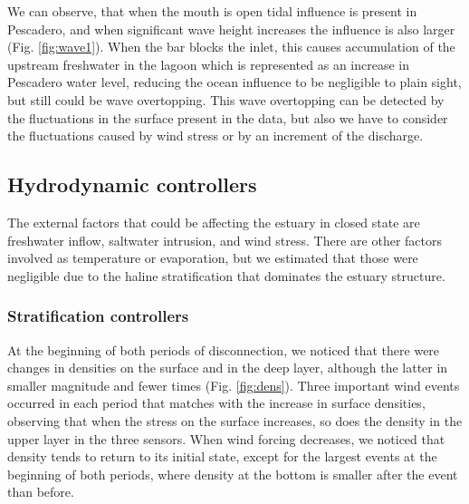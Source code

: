\documentclass[11pt,letterpaper]{article}
\begin{document}
We can observe, that when the mouth is open tidal influence is present in Pescadero, and when significant wave height increases the influence is also larger (Fig. \ref{fig:wave1}). When the bar blocks the inlet, this causes accumulation of the upstream freshwater in the lagoon which is represented as an increase in Pescadero water level, reducing the ocean influence to be negligible to plain sight, but still could be wave overtopping. This wave overtopping can be detected by the fluctuations in the surface present in the data, but also we have to consider the fluctuations caused by wind stress or by an increment of the discharge.\\

\subsection{Hydrodynamic controllers}

The external factors that could be affecting the estuary in closed state are freshwater inflow, saltwater intrusion, and wind stress. There are other factors involved as temperature or evaporation, but we estimated that those were negligible due to the haline stratification that dominates the estuary structure.\\

\subsubsection{Stratification controllers}

At the beginning of both periods of disconnection, we noticed that there were changes in densities on the surface and in the deep layer, although the latter in smaller magnitude and fewer times (Fig. \ref{fig:dens}). Three important wind events occurred in each period that matches with the increase in surface densities, observing that when the stress on the surface increases, so does the density in the upper layer in the three sensors. When wind forcing decreases, we noticed that density tends to return to its initial state, except for the largest events at the beginning of both periods, where density at the bottom is smaller after the event than before.\\
\end{document}
